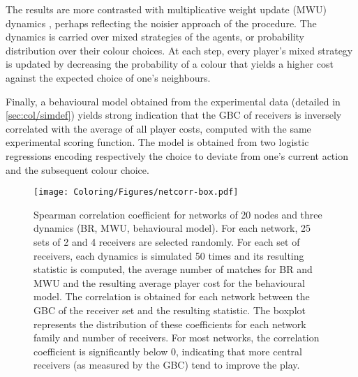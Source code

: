The results are more contrasted with multiplicative weight update (MWU) dynamics \citep{littlestone1994weighted}, perhaps reflecting the noisier approach of the procedure. The dynamics is carried over mixed strategies of the agents, or probability distribution over their colour choices. At each step, every player's mixed strategy is updated by decreasing the probability of a colour that yields a higher cost against the expected choice of one's neighbours.

Finally, a behavioural model obtained from the experimental data (detailed in \ref{sec:col/simdef}) yields strong indication that the GBC of receivers is inversely correlated with the average of all player costs, computed with the same experimental scoring function. The model is obtained from two logistic regressions encoding respectively the choice to deviate from one's current action and the subsequent colour choice.

\begin{figure}
  \centering
  \texttt{[image: Coloring/Figures/netcorr-box.pdf]}
  \caption{Spearman correlation coefficient for networks of 20 nodes and three dynamics (BR, MWU, behavioural model). For each network, 25 sets of 2 and 4 receivers are selected randomly. For each set of receivers, each dynamics is simulated 50 times and its resulting statistic is computed, the average number of matches for BR and MWU and the resulting average player cost for the behavioural model. The correlation is obtained for each network between the GBC of the receiver set and the resulting statistic. The boxplot represents the distribution of these coefficients for each network family and number of receivers. For most networks, the correlation coefficient is significantly below 0, indicating that more central receivers (as measured by the GBC) tend to improve the play.}
	\label{fig:netgbc}
\end{figure}
